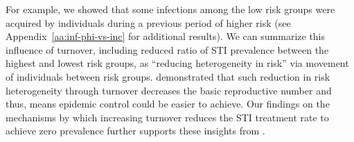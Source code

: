 For example, we showed that some infections among the low risk groups
were acquired by individuals during a previous period of higher risk
(see Appendix~\ref{aa:inf-phi-vs-inc} for additional results).
We can summarize this influence of turnover,
including reduced ratio of STI prevalence between the highest and lowest risk groups,
as ``reducing heterogeneity in risk'' via movement of individuals between risk groups.
\citet{Henry2015} demonstrated that
such reduction in risk heterogeneity through turnover
decreases the basic reproductive number and thus,
means epidemic control could be easier to achieve.
Our findings on the mechanisms by which increasing turnover
reduces the STI treatment rate to achieve zero prevalence
further supports these insights from \citet{Henry2015}.
